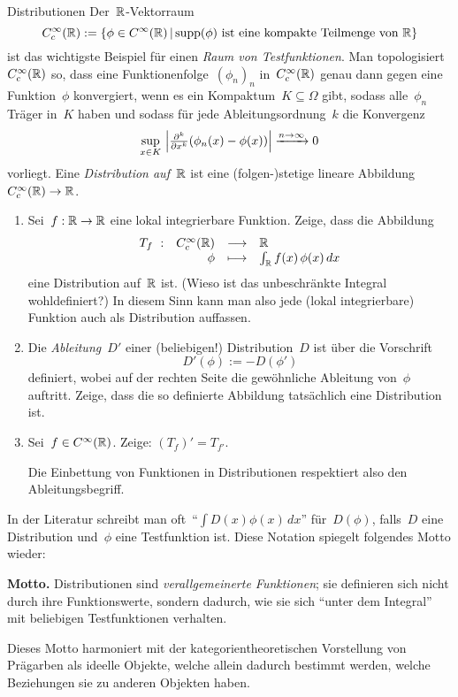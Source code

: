 \documentclass{pizzablatt}
\begin{document}
\newpage

\begin{aufgabe}{Distributionen}
Der~$\mathbb{R}$-Vektorraum
\[ C^\infty_c(\mathbb{R}) := \{ \phi \in C^\infty(\mathbb{R}) \,|\,
  \text{$\operatorname{supp}(\phi)$ ist eine kompakte Teilmenge von~$\mathbb{R}$}
  \} \]
ist das wichtigste Beispiel für einen \emph{Raum von Testfunktionen}. Man
topologisiert~$C^\infty_c(\mathbb{R})$ so, dass eine Funktionenfolge~$(\phi_n)_n$
in~$C^\infty_c(\mathbb{R})$ genau dann gegen eine Funktion~$\phi$ konvergiert, wenn
es ein Kompaktum~$K \subseteq \Omega$ gibt, sodass alle~$\phi_n$ Träger in~$K$
haben und sodass für jede Ableitungsordnung~$k$ die Konvergenz
\[ \sup_{x \in K}\ \Bigl|\tfrac{\partial^k}{\partial x^k} (\phi_n(x) -
\phi(x))\Bigr| \xrightarrow{n \to \infty} 0 \]
vorliegt. Eine \emph{Distribution auf~$\mathbb{R}$} ist eine (folgen-)stetige lineare
Abbildung~$C^\infty_c(\mathbb{R}) \to \mathbb{R}$.

\begin{enumerate}
\item Sei~$f : \mathbb{R} \to \mathbb{R}$ eine lokal integrierbare Funktion. Zeige, dass die Abbildung
\[ \begin{array}{@{}rrcl@{}}
  T_f\ : & C^\infty_c(\RR) &\longrightarrow& \RR \\
  & \phi &\longmapsto& \int_\RR f(x) \, \phi(x) \,dx
\end{array} \]
eine Distribution auf~$\mathbb{R}$ ist. (Wieso ist das unbeschränkte Integral
wohldefiniert?) In diesem Sinn kann man also jede (lokal integrierbare) Funktion
auch als Distribution auffassen.
\item Die \emph{Ableitung~$D'$} einer (beliebigen!) Distribution~$D$ ist über die Vorschrift
\[ D'(\phi) := -D(\phi') \]
definiert, wobei auf der rechten Seite die gewöhnliche Ableitung von~$\phi$
auftritt. Zeige, dass die so definierte Abbildung tatsächlich eine Distribution
ist.
\item Sei~$f \in C^\infty(\mathbb{R})$. Zeige: $(T_f)' = T_{f'}$.

Die Einbettung von Funktionen in Distributionen respektiert also den
Ableitungsbegriff.
\end{enumerate}

In der Literatur schreibt man oft~"`$\int D(x) \phi(x)
\,dx$"' für~$D(\phi)$, falls~$D$ eine Distribution und~$\phi$ eine Testfunktion
ist. Diese Notation spiegelt folgendes Motto wieder:

\textbf{Motto.} Distributionen sind \emph{verallgemeinerte Funktionen}; sie
definieren sich nicht durch ihre Funktionswerte, sondern dadurch, wie sie sich
"`unter dem Integral"' mit beliebigen Testfunktionen verhalten.

Dieses Motto harmoniert mit der kategorientheoretischen Vorstellung von
Prägarben als ideelle Objekte, welche allein dadurch bestimmt werden, welche Beziehungen sie zu
anderen Objekten haben.
\end{aufgabe}
\end{document}
